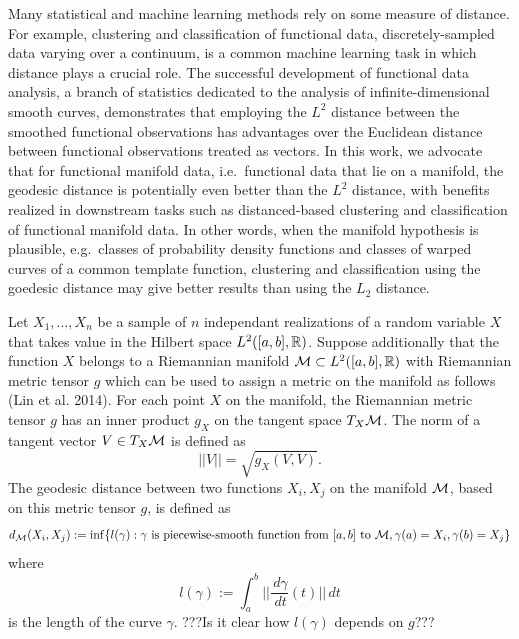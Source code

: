 Many statistical and machine learning methods rely on some measure of
distance. For example, clustering and classification of functional data,
discretely-sampled data varying over a continuum, is a common machine
learning task in which distance plays a crucial role. The successful
development of functional data analysis, a branch of statistics
dedicated to the analysis of infinite-dimensional smooth curves,
demonstrates that employing the \(L^2\) distance between the smoothed
functional observations has advantages over the Euclidean distance
between functional observations treated as vectors. In this work, we
advocate that for functional manifold data, i.e.~functional data that
lie on a manifold, the geodesic distance is potentially even better than
the \(L^2\) distance, with benefits realized in downstream tasks such as
distanced-based clustering and classification of functional manifold
data. In other words, when the manifold hypothesis is plausible,
e.g.~classes of probability density functions and classes of warped
curves of a common template function, clustering and classification
using the goedesic distance may give better results than using the
\(L_2\) distance.

Let \(X_1,\ldots,X_n\) be a sample of \(n\) independant realizations of
a random variable \(X\) that takes value in the Hilbert space
\(L^2([a,b],\mathbb{R})\). Suppose additionally that the function \(X\) belongs
to a Riemannian manifold \(\mathcal{M} \subset L^2([a,b],\mathbb{R})\) with Riemannian
metric tensor \(g\) which can be used to assign a metric on the manifold
as follows (Lin et al. 2014). For each point \(X\) on the manifold, the
Riemannian metric tensor \(g\) has an inner product \(g_X\) on the
tangent space \(T_X \mathcal{M}\). The norm of a tangent vector \(V \in T_X \mathcal{M}\)
is defined as \[||V|| = \sqrt{g_X(V,V)}.\] The geodesic distance between
two functions \(X_i,X_j\) on the manifold \(\mathcal{M}\), based on this metric
tensor \(g\), is defined as
\[ d_{\mathcal{M}}(X_i,X_j):=\inf \{l(\gamma): \gamma \text{ is piecewise-smooth function from } [a,b] \text{ to } \mathcal{M}, \gamma(a) = X_i, \gamma(b) = X_j \}\]
where \[ l(\gamma) := \int_a^b || \frac{\,d\gamma}{\,d t}(t) || \,dt\]
is the length of the curve \(\gamma\). ???Is it clear how \(l(\gamma)\)
depends on \(g\)???

